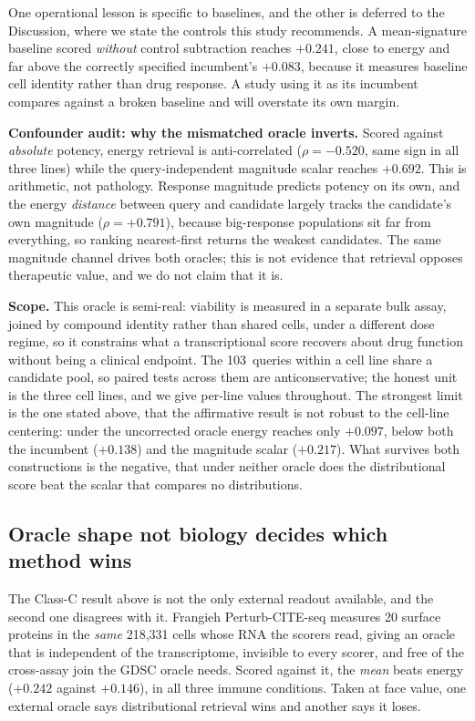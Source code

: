 \documentclass[11pt,letterpaper]{article}
\newcommand{\NCQUERIES}{103}
\newcommand{\MEANCTRLFUNC}{+0.083}
\newcommand{\MEANRAWFUNC}{+0.241}
\begin{document}
One operational lesson is specific to baselines, and the other is deferred to the Discussion,
where we state the controls this study recommends. A mean-signature baseline scored \emph{without}
control subtraction reaches $\MEANRAWFUNC$, close to energy and far above the correctly specified
incumbent's $\MEANCTRLFUNC$, because it measures baseline cell identity rather than drug response.
A study using it as its incumbent compares against a broken baseline and will overstate its own
margin.

\textbf{Confounder audit: why the mismatched oracle inverts.} Scored against \emph{absolute}
potency, energy retrieval is anti-correlated ($\rho = -0.520$, same sign in all three lines) while
the query-independent magnitude scalar reaches $+0.692$. This is arithmetic, not pathology.
Response magnitude predicts potency on its own, and the energy \emph{distance} between query and
candidate largely tracks the candidate's own magnitude ($\rho = +0.791$), because big-response
populations sit far from everything, so ranking nearest-first returns the weakest candidates. The
same magnitude channel drives both oracles; this is not evidence that retrieval opposes therapeutic
value, and we do not claim that it is.

\textbf{Scope.} This oracle is semi-real: viability is measured in a separate bulk assay, joined by
compound identity rather than shared cells, under a different dose regime, so it constrains what a
transcriptional score recovers about drug function without being a clinical endpoint. The
\NCQUERIES\ queries within a cell line share a candidate pool, so paired tests across them are
anticonservative; the honest unit is the three cell lines, and we give per-line values throughout.
The strongest limit is the one stated above, that the affirmative result is not robust to the
cell-line centering: under the uncorrected oracle energy reaches only $+0.097$, below both the
incumbent ($+0.138$) and the magnitude scalar ($+0.217$). What survives both constructions is the
negative, that under neither oracle does the distributional score beat the scalar that compares no
distributions.

\subsection*{Oracle shape not biology decides which method wins}

The Class-C result above is not the only external readout available, and the second one disagrees
with it. Frangieh Perturb-CITE-seq measures 20 surface proteins in the \emph{same} 218,331 cells
whose RNA the scorers read, giving an oracle that is independent of the transcriptome, invisible to
every scorer, and free of the cross-assay join the GDSC oracle needs. Scored against it, the
\emph{mean} beats energy ($+0.242$ against $+0.146$), in all three immune conditions. Taken at face
value, one external oracle says distributional retrieval wins and another says it loses.
\end{document}
